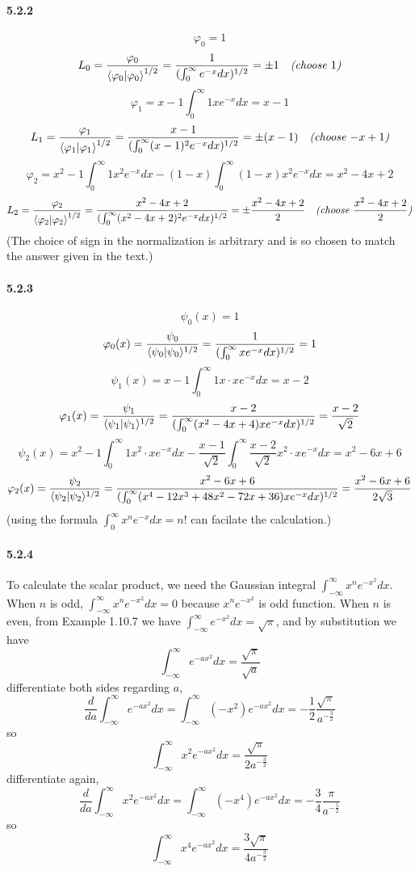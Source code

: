 \documentclass[a4paper]{article}
\begin{document}
\paragraph{5.2.2}
\[
\varphi_0=1
\]
\[
L_0=\frac{\varphi_0}{{\langle\varphi_0|\varphi_0\rangle}^{1/2}}=\frac{1}{(\int_0^\infty e^{-x}dx)^{1/2}}=\pm1\quad\textit{(choose $1$)}
\]
\[
\varphi_1=x-1\int_0^\infty1 xe^{-x}dx=x-1
\]
\[
L_1=\frac{\varphi_1}{{\langle\varphi_1|\varphi_1\rangle}^{1/2}}=\frac{x-1}{(\int_0^\infty(x-1)^2e^{-x}dx)^{1/2}}=\pm(x-1)\quad\textit{(choose $-x+1$)}
\]
\[
\varphi_2=x^2-1\int_0^\infty1x^2e^{-x}dx-(1-x)\int_0^\infty(1-x)x^2e^{-x}dx=x^2-4x+2
\]
\[
L_2=\frac{\varphi_2}{{\langle\varphi_2|\varphi_2\rangle}^{1/2}}=\frac{x^2-4x+2}{(\int_0^\infty (x^2-4x+2)^2e^{-x}dx)^{1/2}}=\pm\frac{x^2-4x+2}{2}\quad\textit{(choose $\frac{x^2-4x+2}{2}$)}
\]
(The choice of sign in the normalization is arbitrary and is so chosen to match the answer given in the text.)

\paragraph{5.2.3}
\[
\psi_0(x)=1
\]
\[
\varphi_0(x)=\frac{\psi_0}{\langle\psi_0|\psi_0\rangle^{1/2}}=\frac{1}{(\int_0^\infty xe^{-x}dx)^{1/2}}=1
\]
\[
\psi_1(x)=x-1\int_0^\infty1x\cdot xe^{-x}dx=x-2
\]
\[
\varphi_1(x)=\frac{\psi_1}{\langle\psi_1|\psi_1\rangle^{1/2}}=\frac{x-2}{(\int_0^\infty(x^2-4x+4)xe^{-x}dx)^{1/2}}=\frac{x-2}{\sqrt{2}}
\]
\[
\psi_2(x)=x^2-1\int_0^\infty1x^2\cdot xe^{-x}dx-\frac{x-1}{\sqrt{2}}\int_0^\infty\frac{x-2}{\sqrt{2}}x^2\cdot xe^{-x}dx=x^2-6x+6
\]
\[
\varphi_2(x)=\frac{\psi_2}{\langle\psi_2|\psi_2\rangle^{1/2}}=\frac{x^2-6x+6}{(\int_0^\infty(x^4-12x^3+48x^2-72x+36)xe^{-x}dx)^{1/2}}=\frac{x^2-6x+6}{2\sqrt{3}}
\]
(using the formula $\int_0^\infty x^ne^{-x}dx=n!$ can facilate the calculation.)

\paragraph{5.2.4}
To calculate the scalar product, we need the Gaussian integral $\int_{-\infty}^\infty x^ne^{-x^2}dx$. When $n$ is odd, $\int_{-\infty}^\infty x^ne^{-x^2}dx=0$ because $x^ne^{-x^2}$ is odd function. When $n$ is even, from Example 1.10.7 we have $\int_{-\infty}^\infty e^{-x^2}dx=\sqrt{\pi}$, and by substitution we have
\[
\int_{-\infty}^\infty e^{-ax^2}dx=\frac{\sqrt{\pi}}{\sqrt{a}}
\]
differentiate both sides regarding $a$, 
\[
\frac{d}{da}\int_{-\infty}^\infty e^{-ax^2}dx=\int_{-\infty}^\infty (-x^2)e^{-ax^2}dx=-\frac{1}{2}\frac{\sqrt{\pi}}{a^{-\frac{3}{2}}}
\]
so
\[
\int_{-\infty}^\infty x^2e^{-ax^2}dx=\frac{\sqrt{\pi}}{2a^{-\frac{3}{2}}}
\]
differentiate again,
\[
\frac{d}{da}\int_{-\infty}^\infty x^2e^{-ax^2}dx=\int_{-\infty}^\infty (-x^4)e^{-ax^2}dx=-\frac{3}{4}\frac{\pi}{a^{-\frac{5}{2}}}
\]
so
\[
\int_{-\infty}^\infty x^4e^{-ax^2}dx=\frac{3\sqrt{\pi}}{4a^{-\frac{3}{2}}}
\]
\medskip
\end{document}
